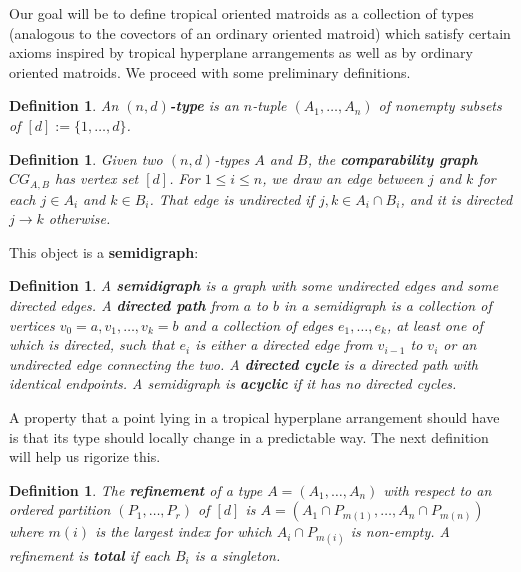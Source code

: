 \documentclass[11pt]{amsart}
\newtheorem{defn}[thm]{Definition}
\begin{document}
Our goal will be to define tropical oriented matroids as a collection of types
(analogous to the covectors of an ordinary oriented matroid) which satisfy  
certain axioms inspired by tropical hyperplane arrangements as well as by ordinary 
oriented matroids. We proceed with some preliminary definitions.

\begin{defn}
An \textbf{$(n, d)$-type} is an $n$-tuple $(A_1,\ldots, A_n)$ of nonempty subsets of $[d]:=\{1,\ldots,d\}$.
\end{defn}


\begin{defn}
Given two $(n,d)$-types $A$ and $B$, the \textbf{comparability graph} $CG_{A, 
B}$ has vertex set $[d]$. For $1\leq i \leq n$, we draw an edge between $j$ and $k$ for each $j \in A_i$ and $k \in B_i$. That edge is undirected if $j,k \in A_i \cap B_i$, and it is directed $j \rightarrow k$ otherwise.
\end{defn}

This object is a \textbf{semidigraph}:

\begin{defn}
A \textbf{semidigraph} is a graph with some undirected edges and some 
directed edges. A \textbf{directed path} from $a$ to $b$ in a semidigraph 
is a collection of vertices $v_0 = a, v_1, \ldots, v_k = b$ and a 
collection of edges $e_1, \ldots, e_k$, at least one of which is directed, such that $e_i$ is either a 
directed edge from $v_{i-1}$ to $v_i$ or an undirected edge connecting the 
two. A \textbf{directed cycle} is 
a directed path with identical endpoints. A semidigraph is 
\textbf{acyclic} if it has no directed cycles.
\end{defn}
 


A property that a point lying in a tropical hyperplane arrangement should have is that its type should locally change in a predictable way. The 
next definition will help us rigorize this.

\begin{defn}


The \textbf{refinement} of a type $A = (A_1, \ldots, A_n)$ with respect to an ordered partition $(P_1, \ldots, P_r)$ of $[d]$ is $A = (A_1 \cap P_{m(1)}, \ldots, A_n \cap P_{m(n)})$
where $m(i)$ is the largest index for which $A_i \cap P_{m(i)}$ is non-empty.
A refinement is \textbf{total} if 
each $B_i$ is a singleton.
\end{defn}
\end{document}
